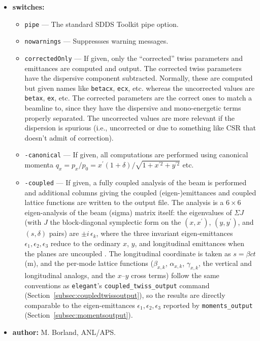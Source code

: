 \documentclass[11pt]{article}
\begin{document}
\begin{itemize}
\begin{itemize}
\end{itemize}

\item {\bf switches:}
\begin{itemize}
\item {\tt pipe} --- The standard SDDS Toolkit pipe option.
\item {\tt nowarnings} --- Suppressses warning messages.
\item {\tt correctedOnly} --- If given, only the ``corrected'' twiss parameters and emittances are computed and
 output.  The corrected twiss parameters have the dispersive component subtracted.  Normally, these are
computed but given names like \verb|betacx|, \verb|ecx|, etc. whereas the uncorrected values are 
\verb|betax|, \verb|ex|, etc. The corrected parameters are the correct ones to match a beamline to, since they have the
 dispersive and mono-energetic terms properly separated.  The uncorrected values are more relevant if the dispersion
is spurious (i.e., uncorrected or due to something like CSR that doesn't admit of correction).
\item {\tt -canonical} --- If given, all computations are performed using canonical momenta
  $q_x = p_x/p_0 = x^\prime (1 + \delta)/\sqrt{1 + x^{\prime 2} + y^{\prime 2}}$ etc.
\item {\tt -coupled} --- If given, a fully coupled analysis of the beam is performed and additional
  columns giving the coupled (eigen-)emittances and coupled lattice functions are written to the
  output file.  The analysis is a $6\times6$ eigen-analysis of the beam (sigma) matrix itself: the
  eigenvalues of $\Sigma J$ (with $J$ the block-diagonal symplectic form on the
  $(x,x^\prime)$, $(y,y^\prime)$, and $(s,\delta)$ pairs) are $\pm i\,\epsilon_k$, where the three
  invariant eigen-emittances $\epsilon_1,\epsilon_2,\epsilon_3$ reduce to the ordinary $x$, $y$, and
  longitudinal emittances when the planes are uncoupled \cite{Wolski-PRSTAB9-024001}.  The
  longitudinal coordinate is taken as $s = \beta c t$ (m), and the per-mode lattice functions
  ($\beta_{x,k}$, $\alpha_{x,k}$, $\gamma_{x,k}$, the vertical and longitudinal analogs, and the
  $x$--$y$ cross terms) follow the same conventions as {\tt elegant}'s {\tt coupled\_twiss\_output}
  command (Section~\ref{subsec:coupledtwissoutput}), so the results are directly comparable to the
  eigen-emittances $\epsilon_1,\epsilon_2,\epsilon_3$ reported by {\tt moments\_output}
  (Section~\ref{subsec:momentsoutput}).  
\end{itemize}

\item {\bf author:} M. Borland, ANL/APS.
\end{itemize}
\end{document}
